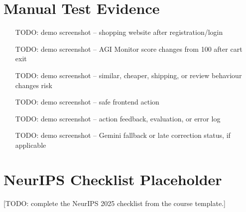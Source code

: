 \documentclass{article}
\begin{document}
\section{Manual Test Evidence}
\begin{itemize}[leftmargin=*]
  \item [TODO: demo screenshot -- shopping website after registration/login]
  \item [TODO: demo screenshot -- AGI Monitor score changes from 100 after cart exit]
  \item [TODO: demo screenshot -- similar, cheaper, shipping, or review behaviour changes risk]
  \item [TODO: demo screenshot -- safe frontend action]
  \item [TODO: demo screenshot -- action feedback, evaluation, or error log]
  \item [TODO: demo screenshot -- Gemini fallback or late correction status, if applicable]
\end{itemize}

\section{NeurIPS Checklist Placeholder}
[TODO: complete the NeurIPS 2025 checklist from the course template.]
\end{document}
